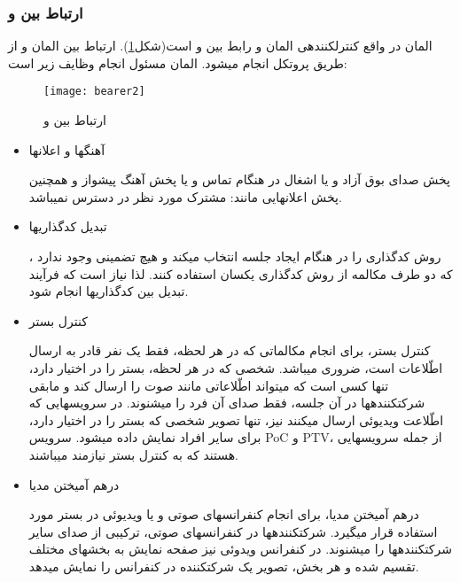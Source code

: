 \subsubsection{ارتباط بین  و }

المان  در واقع کنترل\nf کننده\nf ی المان  و رابط بین  و  است(شکل\ref{bearer2}). ارتباط بین المان   و  از طریق پروتکل  انجام می\nf شود. المان  مسئول انجام وظایف زیر است:

\begin{figure}[h]
\centering
\texttt{[image: bearer2]}
\caption{ارتباط بین  و }
\label{bearer2}
\end{figure}
\begin{itemize}
\item آهنگ\nf ها و اعلان\nf ها

پخش صدای بوق آزاد و یا اشغال در هنگام تماس و یا پخش آهنگ پیشواز و همچنین پخش اعلان\nf هایی مانند: مشترک مورد نظر در دسترس نمی\nf باشد.
\newline
\\
\item تبدیل کدگذاری\nf ها

، روش کدگذاری را در هنگام ایجاد جلسه انتخاب می\nf کند و هیچ تضمینی وجود ندارد که دو طرف مکالمه از روش کدگذاری یکسان استفاده کنند. لذا نیاز است که فرآیند تبدیل بین کدگذاری\nf ها انجام شود.
\item کنترل بستر

کنترل بستر، برای انجام مکالماتی که در هر لحظه، فقط یک نفر قادر به ارسال اطّلاعات است، ضروری می\nf باشد. شخصی که در هر لحظه، بستر را در اختیار دارد، تنها کسی است که می\nf تواند اطّلاعاتی مانند صوت را ارسال کند و مابقی شرکت\nf کننده\nf ها در آن جلسه، فقط صدای آن فرد را می\nf شنوند. در سرویس\nf هایی که اطّلاعت ویدیوئی ارسال می\nf کنند نیز، تنها تصویر شخصی که بستر را در اختیار دارد، برای سایر افراد نمایش داده می\nf شود. سرویس PoC و PTV، از جمله سرویس\nf هایی هستند که به کنترل بستر نیازمند می\nf باشند.

\item درهم آمیختن مدیا

درهم آمیختن مدیا، برای انجام کنفرانس\nf های صوتی و یا ویدیوئی در بستر  مورد استفاده قرار میگیرد. شرکت\nf کننده\nf ها در کنفرانس\nf های صوتی، ترکیبی از صدای سایر شرکت\nf کننده\nf ها را می\nf شنوند. در کنفرانس ویدوئی نیز صفحه نمایش به بخش\nf های مختلف تقسیم شده و هر بخش، تصویر یک شرکت\nf کننده در کنفرانس را نمایش می\nf دهد.
\end{itemize}


